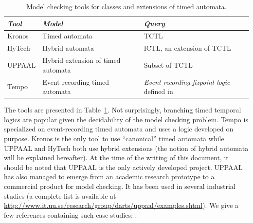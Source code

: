 \begin{table}[htbp]
\footnotesize
\centering
\begin{tabular}{|p{4cm}|p{4cm}|p{4cm}|}

	\hline

	\textit{Tool} &
	\textit{Model} &
	\textit{Query} \\
	
	\hline
	
	Kronos \cite{KRONOS1,KRONOS2} &
	Timed automata &
	TCTL \\
	
	\hline
	
	HyTech \cite{HYTECH} &
	Hybrid automata \cite{ACHH93,alur97symbolic}  &
	ICTL, an extension of TCTL \cite{ACHH93} \\
	
	\hline
	
	UPPAAL \cite{UPPAAL} &
	Hybrid extension of timed automata &
	Subset of TCTL \\
	
	\hline
	
	Tempo \cite{MS01} &
	Event-recording timed automata &
	\emph{Event-recording fixpoint logic} defined in \cite{MS01} \\
	
	\hline

\end{tabular}
\label{tab:ta-model-checkers}
\caption{Model checking tools for classes and extensions of timed automata.}
\end{table}

The tools are presented in Table~\ref{tab:ta-model-checkers}. Not surprisingly, branching timed temporal logics are popular given the decidability of the model checking problem. Tempo is specialized on event-recording timed automata and uses a logic developed on purpose. Kronos is the only tool to use ``canonical'' timed automata while UPPAAL and HyTech both use hybrid extensions (the notion of hybrid automata will be explained hereafter). At the time of the writing of this document, it should be noted that UPPAAL is the only actively developed project. UPPAAL has also managed to emerge from an academic research prototype to a commercial product for model checking. It has been used in several industrial studies (a complete list is available at \url{http://www.it.uu.se/research/group/darts/uppaal/examples.shtml}). We give a few references containing such case studies: \cite{HSLL97, HLS99, DAKRT97, LAAB98, dw00, lpw:tacas98, bowman98automatic, BGKLLPY96, lp:prfts97}. \\

